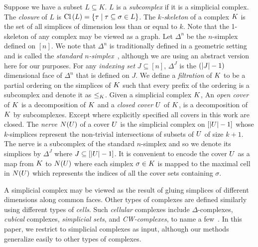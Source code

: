 \documentclass{jocg}
\begin{document}
Suppose we have a subset $L \subseteq K$.  $L$ is a \emph{subcomplex}
if it is a simplicial complex. The \emph{closure} of $L$ is 
$\operatorname{Cl}{(}L) = \{ \tau \mid \tau \subseteq \sigma \in L\}$. The 
\emph{$k$-skeleton} of a complex $K$ is the set of all simplices
of dimension less than or equal to $k$. Note that the 1-skeleton of
any complex may be viewed as a graph. 
Let $\Delta^n$ be the $n$-simplex defined on $[n]$.  We note that 
$\Delta^n$ is traditionally defined in a geometric setting and is 
called the \emph{standard $n$-simplex}~\cite{hatcher}, although we 
are using an abstract version here for our purposes. For any
\emph{indexing set} $J \subseteq [n]$, $\Delta^J$ is the $(|J|-1)$ 
dimensional face of $\Delta^n$  that is defined on $J$.
We define a \emph{filtration} of $K$ to be a partial ordering on the simplices of
$K$ such that every prefix of the ordering is a subcomplex and denote
it as $\leq_{K}$.
Given a simplicial complex $K$, An \emph{open cover}
of $K$ is a decomposition of $K$ and a \emph{closed cover} $U$
of $K$, is a decomposition of $K$ by subcomplexes. Except where explicitly specified
all covers in this work are closed. The \emph{nerve} $N(U)$
of a cover $U$ is the simplicial complex on $[|U|-1]$ whose $k$-simplices 
represent the non-trivial intersections of subsets of $U$ of size $k+1$.
The nerve is a subcomplex of the standard $n$-simplex and so we 
denote its simplices by $\Delta^J$ where $J \subseteq [|U|-1]$. 
It is convenient to encode the cover $U$ as a map from $K$ to $N(U)$ where each 
simplex $\sigma \in K$ is mapped to the maximal cell in $N(U)$  which represents
the indices of all the cover sets containing $\sigma$.

A simplicial complex may be viewed as the result of gluing simplices of 
different dimensions along common faces. Other types of complexes are defined 
similarly using different types of \emph{cells}. 
Such \emph{cellular} complexes include $\Delta$-complexes, \emph{cubical} 
complexes, \emph{simplicial sets}, and \emph{CW-complexes}, 
to name a few~\cite{ez-ssc-50,hatcher,kmm-ch-04,m-soat-68}.
In this paper, we restrict to simplicial complexes as input, although our 
methods generalize easily to other types of complexes. 
\end{document}
